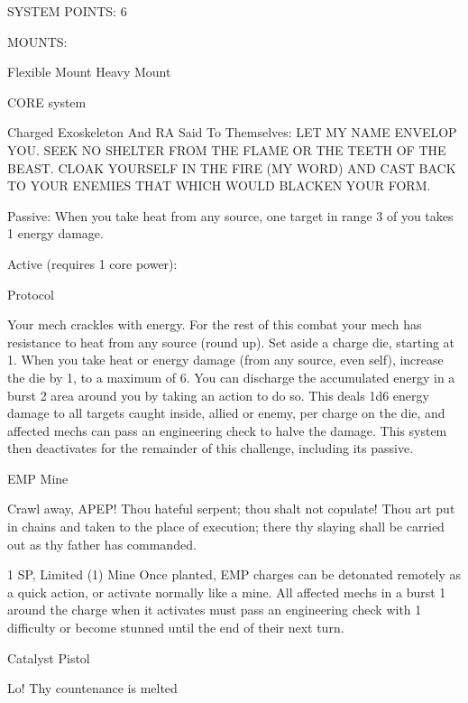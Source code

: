                                              SYSTEM POINTS: 6 

                                                   MOUNTS: 

 Flexible Mount                                         Heavy Mount 

                                                 CORE system 

                                                                                                               


                                             Charged Exoskeleton  
 And RA Said To Themselves: LET MY NAME ENVELOP YOU. SEEK NO SHELTER FROM THE FLAME  
 OR THE TEETH OF THE BEAST. CLOAK YOURSELF IN THE FIRE (MY WORD) AND CAST BACK TO  
 YOUR ENEMIES THAT WHICH WOULD BLACKEN YOUR FORM. 
 

 Passive: When you take heat from any source, one target in range 3 of you takes 1 energy damage.
 
 Active (requires 1 core power):
 
  Protocol
 
 Your mech crackles with energy. For the rest of this combat your mech has resistance to heat from any  
 source (round up). Set aside a charge die, starting at 1. When you take heat or energy damage (from  
 any source, even self), increase the die by 1, to a maximum of 6. You can discharge the accumulated  
 energy in a burst 2 area around you by taking an action to do so. This deals 1d6 energy damage to all  
 targets caught inside, allied or enemy, per charge on the die, and affected mechs can pass an  
 engineering check to halve the damage. This system then deactivates for the remainder of this  
 challenge, including its passive. 

EMP Mine  

Crawl away, APEP! Thou hateful serpent; thou shalt not copulate! Thou art put in chains and taken to the  
place of execution; there thy slaying shall be carried out as thy father has commanded.  

1 SP, Limited (1)  
Mine  
Once planted, EMP charges can be detonated remotely as a quick action, or activate normally  
like a mine. All affected mechs in a burst 1 around the charge when it activates must pass an  
engineering check with 1 difficulty or become stunned until the end of their next turn.
 

Catalyst Pistol
 
Lo! Thy countenance is melted
 
